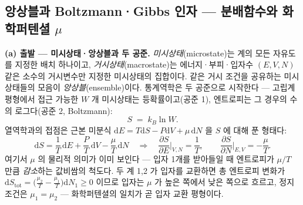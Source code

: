 \documentclass[11pt,a4paper]{article}
\newcommand{\dd}{\mathrm{d}}
\begin{document}
\subsection{앙상블과 Boltzmann·Gibbs 인자 --- 분배함수와 화학퍼텐셜 $\mu$}\label{sec:sm-ensemble}
\textbf{(a) 출발 --- 미시상태·앙상블과 두 공준.} \emph{미시상태}(microstate)는 계의 모든 자유도를 지정한
배치 하나이고, \emph{거시상태}(macrostate)는 에너지·부피·입자수 $(E,V,N)$ 같은 소수의 거시변수만 지정한
미시상태의 집합이다. 같은 거시 조건을 공유하는 미시상태들의 모음이 \emph{앙상블}(ensemble)이다. 통계역학은
두 공준으로 시작한다 --- 고립계 평형에서 접근 가능한 $W$ 개 미시상태는 등확률이고(공준 1), 엔트로피는 그
경우의 수의 로그다(공준 2, Boltzmann):
\begin{equation}
S\;=\;k_B\ln W.
\label{eq:sm-S}
\end{equation}
열역학과의 접점은 근본 미분식 $\dd E=T\dd S-P\dd V+\mu\,\dd N$ 을 $S$ 에 대해 푼 형태다:
\begin{equation}
\dd S=\frac{1}{T}\,\dd E+\frac{P}{T}\,\dd V-\frac{\mu}{T}\,\dd N
\quad\Longrightarrow\quad
\frac{\partial S}{\partial E}\Big|_{V,N}=\frac1T,\qquad
\frac{\partial S}{\partial N}\Big|_{E,V}=-\frac{\mu}{T}.
\label{eq:sm-fund}
\end{equation}
여기서 $\mu$ 의 물리적 의미가 이미 보인다 --- 입자 1개를 받아들일 때 엔트로피가 $\mu/T$ 만큼 \emph{감소}하는
값비쌈의 척도다. 두 계 1,2 가 입자를 교환하면 총 엔트로피 변화가
$\dd S_\mathrm{tot}=\big(\tfrac{\mu_2}{T}-\tfrac{\mu_1}{T}\big)\dd N_1\ge0$ 이므로 입자는 $\mu$ 가 높은 쪽에서
낮은 쪽으로 흐르고, 정지 조건은 $\mu_1=\mu_2$ --- 화학퍼텐셜의 일치가 곧 입자 교환 평형이다.
\end{document}
